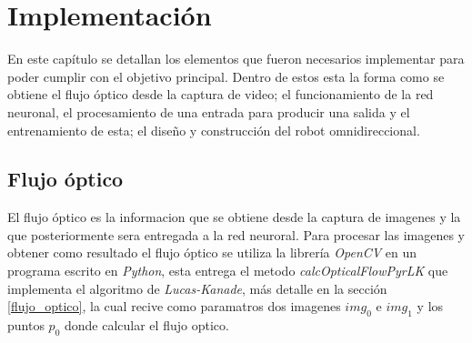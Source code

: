 \documentclass{iccmemoria}
\begin{document}
\begin{table}[H]
\caption[Paquete de datos de movimiento \emph{mouse} PS/2.]{Paquete de datos del movimiento del \emph{mouse}.}\label{tab:ps/2 package}
\end{table}



\chapter{Implementación}

En este capítulo se detallan los elementos que fueron necesarios implementar para poder cumplir con el objetivo principal. Dentro de estos esta la forma como se obtiene el flujo óptico desde la captura de video; el funcionamiento de la red neuronal, el procesamiento de una entrada para producir una salida y el entrenamiento de esta; el diseño y construcción del robot omnidireccional.\\
 
\section{Flujo óptico}

El flujo óptico es la informacion que se obtiene desde la captura de imagenes y la que posteriormente sera entregada a la red neuroral. Para procesar las imagenes y obtener como resultado el flujo óptico se utiliza la librería \emph{OpenCV} en un programa escrito en \emph{Python}, esta entrega el metodo \emph{calcOpticalFlowPyrLK} que implementa el algoritmo de \emph{Lucas-Kanade}, más detalle en la sección \ref{flujo_optico}, la cual recive como paramatros dos imagenes $img_0$ e $img_1$ y los puntos $p_0$ donde calcular el flujo optico.\\
\end{document}
